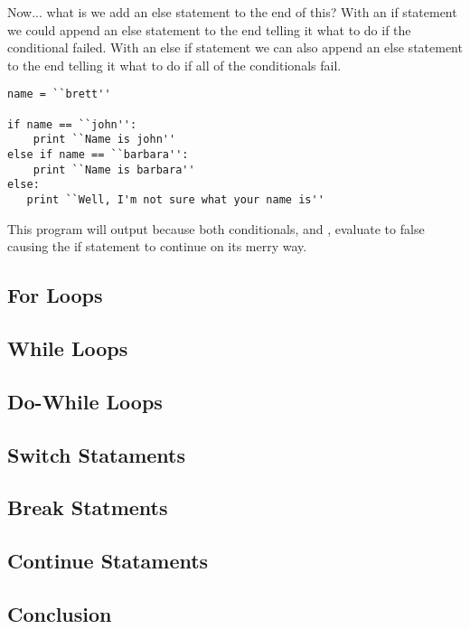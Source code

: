 Now... what is we add an else statement to the end of this?
With an if statement we could append an else statement to the end telling it what to do if the conditional failed.
With an else if statement we can also append an else statement to the end telling it what to do if all of the conditionals fail.

\begin{lstlisting}[caption={Else If Else Statement}]
name = ``brett''

if name == ``john'':
    print ``Name is john''
else if name == ``barbara'':
    print ``Name is barbara''
else:
   print ``Well, I'm not sure what your name is''
\end{lstlisting}

This program will output  because both conditionals,  and , evaluate to false causing the if statement to continue on its merry way.

\subsection{For Loops}

\subsection{While Loops}

\subsection{Do-While Loops}

\subsection{Switch Stataments}

\subsection{Break Statments}

\subsection{Continue Stataments}

\subsection{Conclusion}
